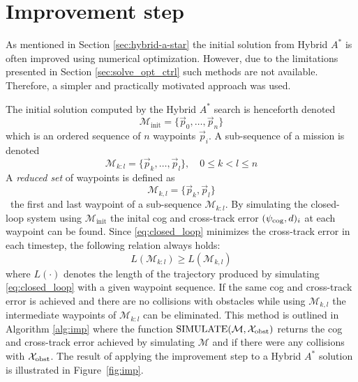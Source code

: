 \section{Improvement step}
As mentioned in Section \ref{sec:hybrid-a-star} the initial solution from Hybrid $A^*$ is often improved using numerical optimization. 
However, due to the limitations presented in Section \ref{sec:solve_opt_ctrl} such methods are not available. Therefore, a simpler and practically motivated approach was used.

The initial solution computed by the Hybrid $A^*$ search is henceforth denoted
\begin{equation}
    \mathcal{M}_{\text{init}}=\{\vec{p}_0,\hdots,\vec{p}_n\}    
\end{equation}
which is an ordered sequence of $n$ waypoints $\vec{p}_i$. A sub-sequence of a mission is denoted
\begin{equation}
    \mathcal{M}_{k:l}=\{\vec{p}_k,\hdots,\vec{p}_l\}, \quad 0\leq k<l\leq n
\end{equation}
A \textit{reduced set} of waypoints is defined as 
\begin{equation}
    \mathcal{M}_{k,l}=\{\vec{p}_k,\vec{p}_l\}
\end{equation}
\ie\ the first and last waypoint of a sub-sequence $\mathcal{M}_{k:l}$. By simulating the closed-loop system using $\mathcal{M}_{\text{init}}$ the inital \ac{cog} and cross-track error $(\psi_{\text{cog}},d)_i$ at each waypoint can be found. 
Since \eqref{eq:closed_loop} minimizes the cross-track error in each timestep, the following relation always holds:
\begin{equation}
    L(\mathcal{M}_{k:l})\geq L(\mathcal{M}_{k,l})
\end{equation}
where $L(\cdot)$ denotes the length of the trajectory produced by simulating \eqref{eq:closed_loop} with a given waypoint sequence. If the same \ac{cog} and cross-track error 
is achieved and there are no collisions with obstacles while using $\mathcal{M}_{k,l}$ the intermediate waypoints of $\mathcal{M}_{k:l}$ can be eliminated. This method is outlined in Algorithm \eqref{alg:imp} where 
the function $\text{SIMULATE}(\mathcal{M},\mathcal{X}_{\text{obst}})$ returns the \ac{cog} and cross-track error achieved by simulating $\mathcal{M}$ and if there were any 
collisions with $\mathcal{X}_{\text{obst}}$. The result of applying the improvement step to a Hybrid $A^*$ solution is illustrated in Figure~\ref{fig:imp}.

